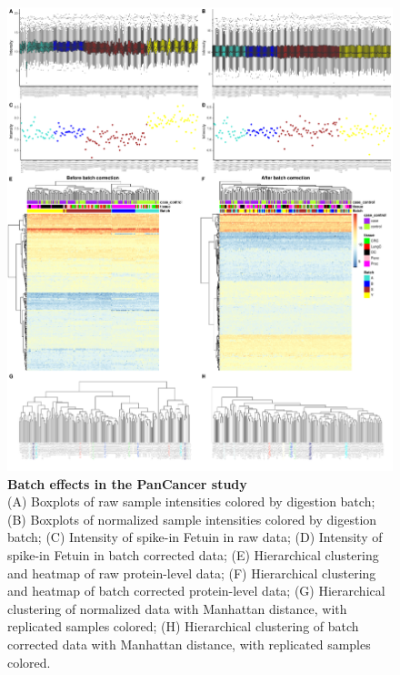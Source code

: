 \documentclass[num-refs]{wiley-article}
\begin{document}
\begin{figure}
	\includegraphics[width=\textwidth]{figures/Supp_Fig2_PanCancer}
	
	\caption{\textbf{Batch effects in the PanCancer study} \\
		\footnotesize (A) Boxplots of raw sample intensities colored by digestion batch; (B) Boxplots of normalized sample intensities colored by digestion batch; 
		(C) Intensity of spike-in Fetuin in raw data; (D) Intensity of spike-in Fetuin in batch corrected data; (E) Hierarchical clustering and heatmap of raw protein-level data; (F) Hierarchical clustering and heatmap of batch corrected protein-level data; (G) Hierarchical clustering of normalized data with Manhattan distance, with replicated samples colored; (H) Hierarchical clustering of batch corrected data with Manhattan distance, with replicated samples colored.}
	\label{fig:batch_figS2_PanCancer}
\end{figure}
\end{document}
